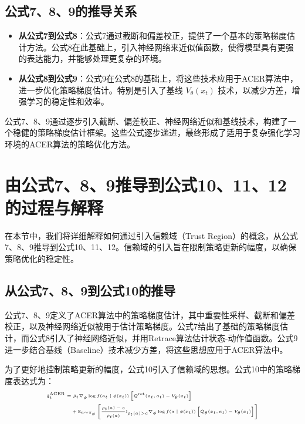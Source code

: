 \documentclass[twocolumn, 10pt]{article} %
\theoremstyle{remark}
\begin{document}
\subsection{公式7、8、9的推导关系}

\begin{itemize}
    \item \textbf{从公式7到公式8}：公式7通过截断和偏差校正，提供了一个基本的策略梯度估计方法。公式8在此基础上，引入神经网络来近似值函数，使得模型具有更强的表达能力，并能够处理更复杂的环境。
    \item \textbf{从公式8到公式9}：公式9在公式8的基础上，将这些技术应用于ACER算法中，进一步优化策略梯度估计。特别是引入了基线 \( V_\theta(x_t) \) 技术，以减少方差，增强学习的稳定性和效率。
\end{itemize}

公式7、8、9通过逐步引入截断、偏差校正、神经网络近似和基线技术，构建了一个稳健的策略梯度估计框架。这些公式逐步递进，最终形成了适用于复杂强化学习环境的ACER算法的策略优化方法。




\section{由公式7、8、9推导到公式10、11、12的过程与解释}

在本节中，我们将详细解释如何通过引入信赖域（Trust Region）的概念，从公式7、8、9推导到公式10、11、12。信赖域的引入旨在限制策略更新的幅度，以确保策略优化的稳定性。

\subsection{从公式7、8、9到公式10的推导}

公式7、8、9定义了ACER算法中的策略梯度估计，其中重要性采样、截断和偏差校正，以及神经网络近似被用于估计策略梯度。公式7给出了基础的策略梯度估计，而公式8引入了神经网络近似，并用Retrace算法估计状态-动作值函数。公式9进一步结合基线（Baseline）技术减少方差，将这些思想应用于ACER算法中。

为了更好地控制策略更新的幅度，公式10引入了信赖域的思想。公式10中的策略梯度表达式为：
\[
\tiny
\begin{aligned}
\hat{g}_t^{\text{ACER}} = &\ \bar{\rho}_t \nabla_\phi \log f(a_t \mid \phi(x_t)) \left[ Q^{\text{ret}}(x_t, a_t) - V_\theta(x_t) \right] \\
&+ \mathbb{E}_{a \sim \pi_\phi} \left[ \frac{\rho_t(a) - c}{\rho_t(a)} \mathbb{I}_{\rho_t(a) > c} \nabla_\phi \log f(a \mid \phi(x_t)) \left[ Q_\theta(x_t, a_t) - V_\theta(x_t) \right] \right]
\end{aligned}
\]
\end{document}
